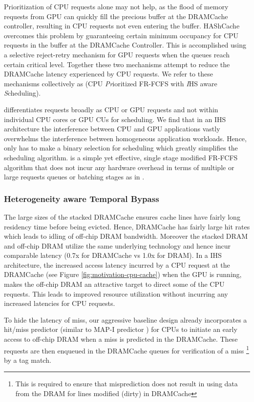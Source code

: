 \par Prioritization of CPU requests alone may not help, as the flood of memory requests from  GPU can quickly fill the precious buffer at the DRAMCache controller, resulting in CPU requests not even entering the buffer. HAShCache overcomes this problem by guaranteeing certain minimum occupancy for CPU requests in the buffer at the DRAMCache Controller. This is accomplished using a selective reject-retry mechanism for GPU requests when the queues reach certain critical level.  Together these two mechanisms attempt to reduce the DRAMCache latency experienced by CPU requests.  We refer to these  mechanisms collectively as \prioname (CPU \emph{Pr}ioritized FR-FCFS with \emph{I}HS aware \emph{S}cheduling). 
\par \prioname differentiates requests broadly as CPU or GPU requests and not within individual CPU cores or GPU CUs for scheduling. We find that in an IHS architecture the interference between CPU and GPU applications vastly overwhelms the interference between homogeneous application workloads. Hence, \prioname only has to make a binary selection for scheduling which greatly simplifies the scheduling algorithm. \prioname is a simple yet effective, single stage modified FR-FCFS algorithm that does not incur any hardware overhead in terms of multiple or large requests queues or batching stages as in \cite{sms}.


\subsubsection{Heterogeneity aware Temporal Bypass} \label{mechanism-bye}
The large sizes of the stacked DRAMCache ensures cache lines have fairly long residency time before being evicted. Hence, DRAMCache has fairly large hit rates which leads to idling of off-chip DRAM bandwidth. Moreover the stacked DRAM and off-chip DRAM utilize the same underlying technology and hence incur comparable latency (0.7x for DRAMCache vs 1.0x for DRAM). 
In a IHS architecture, the increased access latency incurred by a CPU request at the DRAMCache (see Figure \ref{fig:motivation-cpu-cache}) when the GPU is running, makes the off-chip DRAM an attractive target to direct some of the CPU requests. This leads to improved resource utilization without incurring any increased latencies for CPU requests. 
\par To hide the latency of miss, our aggressive baseline design already incorporates a hit/miss predictor (similar to MAP-I predictor \cite{alloy}) for CPUs to initiate an early access to off-chip DRAM when a miss is predicted in the DRAMCache. These requests are then enqueued in the DRAMCache queues for verification of a miss 
\footnote{This is required to ensure that misprediction does not result in using data from the DRAM for lines modified (dirty) in DRAMCache}
by a tag match. 

